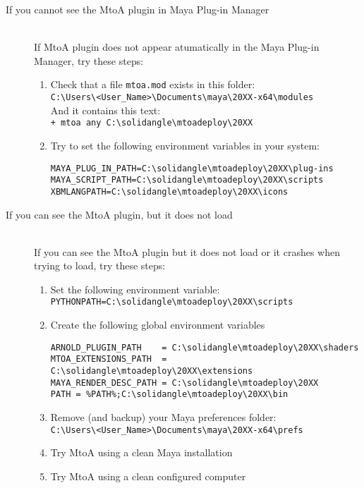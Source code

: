 \begin{description}

\item[If you cannot see the MtoA plugin in Maya Plug-in Manager] \hfill \\

If MtoA plugin does not appear atumatically in the Maya Plug-in Manager, try these steps:

\begin{enumerate}
\item Check that a file \texttt{mtoa.mod} exists in this folder:\\
\verb|C:\Users\<User_Name>\Documents\maya\20XX-x64\modules|\\
And it contains this text:\\
\verb|+ mtoa any C:\solidangle\mtoadeploy\20XX|\\

\item Try to set the following environment variables in your system:
{\footnotesize \begin{verbatim}
MAYA_PLUG_IN_PATH=C:\solidangle\mtoadeploy\20XX\plug-ins
MAYA_SCRIPT_PATH=C:\solidangle\mtoadeploy\20XX\scripts
XBMLANGPATH=C:\solidangle\mtoadeploy\20XX\icons
\end{verbatim}}
\end{enumerate}

\item[If you can see the MtoA plugin, but it does not load] \hfill \\
If you can see the MtoA plugin but it does not load or it crashes when trying to load, try these steps:
\begin{enumerate}
\item Set the following environment variable:\\
\verb|PYTHONPATH=C:\solidangle\mtoadeploy\20XX\scripts|

\item Create the following global environment variables
{\footnotesize \begin{verbatim}
ARNOLD_PLUGIN_PATH    = C:\solidangle\mtoadeploy\20XX\shaders
MTOA_EXTENSIONS_PATH  = C:\solidangle\mtoadeploy\20XX\extensions
MAYA_RENDER_DESC_PATH = C:\solidangle\mtoadeploy\20XX
PATH = %PATH%;C:\solidangle\mtoadeploy\20XX\bin
\end{verbatim}}

\item Remove (and backup) your Maya preferences folder:\\
\verb|C:\Users\<User_Name>\Documents\maya\20XX-x64\prefs|

\item Try MtoA using a clean Maya installation

\item Try MtoA using a clean configured computer

\end{enumerate}

\end{description}

